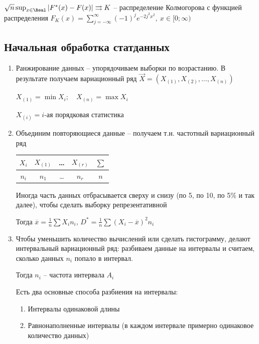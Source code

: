 \begin{MyTheorem}
     $\sqrt{n} \sup_{x \in \Real} |F^*(x) - F(x)| \rightrightarrows K$ -- распределение Колмогорова с 
    функцией распределения $F_K(x) = \sum_{j = -\infty}^{\infty} (-1)^j e^{-2 j^2 x^2}, \ x \in [0;\infty)$
\end{MyTheorem}

\hypertarget{initial_data_processing}{}

\subsection{Начальная обработка статданных}

\begin{enumerate}
    \item Ранжирование данных -- упорядочиваем выборки по возрастанию. В результате получаем вариационный ряд $\vec{X} = (X_{(1)}, X_{(2)}, \dots, X_{(n)})$

    $X_{(1)} = \min X_i; \quad X_{(n)} = \max X_i$

    $X_{(i)} = i$-ая порядковая статистика

    \item Объединим повторяющиеся данные -- получаем т.н. частотный вариационный ряд

    \begin{tabular}{c|c|c|c|c}
        $X_i$ & $X_{(1)}$ & \dots & $X_{(r)}$ & $\sum$ \\ 
        \hline
        $n_i$ & $n_1$ & \dots & $n_r$ & $n$ \\ 
    \end{tabular}

    Иногда часть данных отбрасывается сверху и снизу (по 5, по 10, по 5\% и так далее), чтобы сделать выборку репрезентативной

    Тогда $\overline{x} = \frac{1}{n} \sum X_i n_i$, $D^* = \frac{1}{n} \sum (X_i - \overline{x})^2 n_i$
    
    \item Чтобы уменьшить количество вычислений или сделать гистограмму, делают интервальный вариационный ряд: 
    разбиваем данные на интервалы и считаем, сколько данных $n_i$ попало в интервал. 

    Тогда $n_i$ -- частота интервала $A_i$

    Есть два основные способа разбиения на интервалы: 

    \begin{enumerate}
        \item Интервалы одинаковой длины
        \item Равнонаполненные интервалы (в каждом интервале примерно одинаковое количество данных)
    \end{enumerate}


\end{enumerate}
